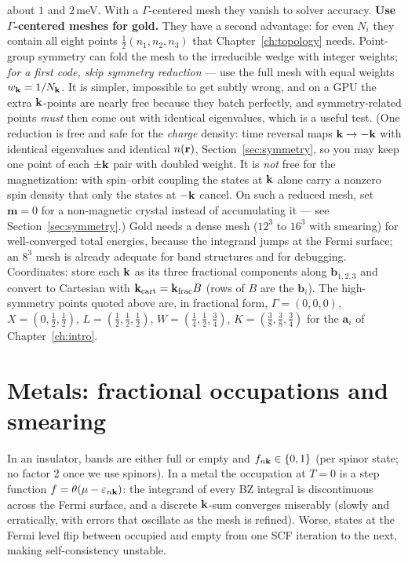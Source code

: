 about $1$ and $2$\,meV. With a $\Gamma$-centered mesh they vanish to
solver accuracy. \textbf{Use $\Gamma$-centered meshes for
gold.} They have a second advantage: for even $N_i$ they contain all eight
points $\tfrac12(n_1,n_2,n_3)$ that Chapter~\ref{ch:topology} needs.
Point-group symmetry can fold the mesh to the irreducible wedge with integer
weights; \emph{for a first code, skip symmetry reduction} --- use the full
mesh with equal weights $w_{\mathbf{k}} = 1/N_{\mathbf{k}}$. It is simpler, impossible to
get subtly wrong, and on a GPU the extra $\mathbf{k}$-points are nearly free because
they batch perfectly, and symmetry-related points \emph{must} then come out
with identical eigenvalues, which is a useful test. (One reduction is free
and safe for the \emph{charge} density: time reversal maps
$\mathbf{k} \to -\mathbf{k}$ with identical eigenvalues and identical $n(\mathbf{r})$,
Section~\ref{sec:symmetry}, so you may keep one point of each $\pm\mathbf{k}$ pair
with doubled weight. It is \emph{not} free for the magnetization: with
spin--orbit coupling the states at $\mathbf{k}$ alone carry a nonzero spin density
that only the states at $-\mathbf{k}$ cancel. On such a reduced mesh, set
$\mathbf m = 0$ for a non-magnetic crystal instead of accumulating it ---
see Section~\ref{sec:symmetry}.) Gold needs a dense mesh ($12^3$ to $16^3$ with
smearing) for well-converged total energies, because the integrand jumps
at the Fermi surface; an $8^3$ mesh is already adequate for band
structures and for debugging. Coordinates:
store each $\mathbf{k}$ as its three fractional components along
$\mathbf b_{1,2,3}$ and convert to Cartesian with $\mathbf{k}_{\mathrm{cart}} =
\mathbf{k}_{\mathrm{frac}} B$ (rows of $B$ are the $\mathbf b_i$). The
high-symmetry points quoted above are, in fractional form,
$\Gamma = (0,0,0)$, $X = (0, \tfrac12, \tfrac12)$,
$L = (\tfrac12,\tfrac12,\tfrac12)$,
$W = (\tfrac14,\tfrac12,\tfrac34)$,
$K = (\tfrac38,\tfrac38,\tfrac34)$ for the $\mathbf a_i$ of
Chapter~\ref{ch:intro}.

\section{Metals: fractional occupations and smearing}
\label{sec:smearing}

In an insulator, bands are either full or empty and $f_{n\mathbf{k}} \in \{0,1\}$
(per spinor state; no factor 2 once we use spinors). In a metal the
occupation at $T=0$ is a step function $f = \theta(\mu -
\varepsilon_{n\mathbf{k}})$: the integrand of every BZ integral is discontinuous
across the Fermi surface, and a discrete $\mathbf{k}$-sum converges miserably
(slowly and erratically, with errors that oscillate as the mesh is
refined). Worse, states at the Fermi level
flip between occupied and empty from one SCF iteration to the next, making
self-consistency unstable.

